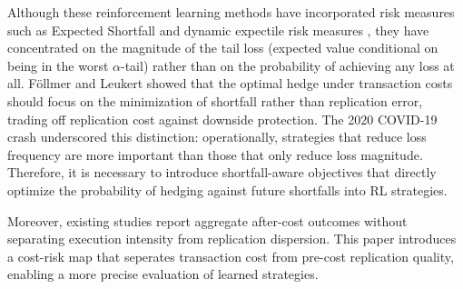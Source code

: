 Although these reinforcement learning methods have incorporated risk measures such as Expected Shortfall \cite{buehler2019deep} and dynamic expectile risk measures \cite{marzban2023deep}, they have concentrated on the magnitude of the tail loss (expected value conditional on being in the worst $\alpha$-tail) rather than on the probability of achieving any loss at all. Föllmer and Leukert \cite{follmer2000efficient} showed that the optimal hedge under transaction costs should focus on the minimization of shortfall rather than replication error, trading off replication cost against downside protection. The 2020 COVID-19 crash underscored this distinction: operationally, strategies that reduce loss frequency are more important than those that only reduce loss magnitude. Therefore, it is necessary to introduce shortfall-aware objectives that directly optimize the probability of hedging against future shortfalls into RL strategies.


Moreover, existing studies report aggregate after-cost outcomes without separating execution intensity from replication dispersion. This paper introduces a cost-risk map that seperates transaction cost from pre-cost replication quality,
enabling a more precise evaluation of learned strategies.
